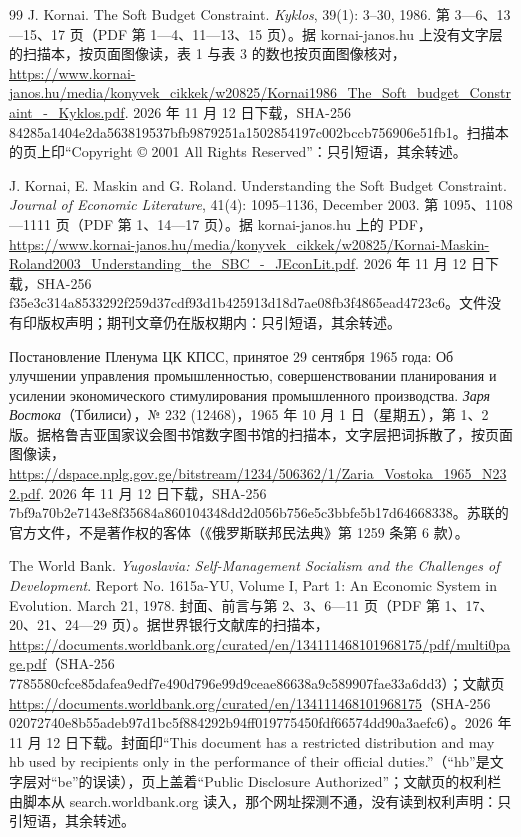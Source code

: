 \begin{thebibliography}{99}
 J. Kornai. The Soft Budget Constraint. \emph{Kyklos}, 39(1): 3--30, 1986. 第 3—6、13—15、17 页（PDF 第 1—4、11—13、15 页）。据 kornai-janos.hu 上没有文字层的扫描本，按页面图像读，表 1 与表 3 的数也按页面图像核对，\url{https://www.kornai-janos.hu/media/konyvek_cikkek/w20825/Kornai1986_The_Soft_budget_Constraint_-_Kyklos.pdf}. 2026 年 11 月 12 日下载，SHA-256 84285a1404e2da563819537bfb9879251a1502854197c002bccb756906e51fb1。扫描本的页上印“Copyright © 2001 All Rights Reserved”：只引短语，其余转述。

 J. Kornai, E. Maskin and G. Roland. Understanding the Soft Budget Constraint. \emph{Journal of Economic Literature}, 41(4): 1095--1136, December 2003. 第 1095、1108—1111 页（PDF 第 1、14—17 页）。据 kornai-janos.hu 上的 PDF，\url{https://www.kornai-janos.hu/media/konyvek_cikkek/w20825/Kornai-Maskin-Roland2003_Understanding_the_SBC_-_JEconLit.pdf}. 2026 年 11 月 12 日下载，SHA-256 f35e3c314a8533292f259d37cdf93d1b425913d18d7ae08fb3f4865ead4723c6。文件没有印版权声明；期刊文章仍在版权期内：只引短语，其余转述。

 Постановление Пленума ЦК КПСС, принятое 29 сентября 1965 года: Об улучшении управления промышленностью, совершенствовании планирования и усилении экономического стимулирования промышленного производства. \emph{Заря Востока}（Тбилиси），№ 232 (12468)，1965 年 10 月 1 日（星期五），第 1、2 版。据格鲁吉亚国家议会图书馆数字图书馆的扫描本，文字层把词拆散了，按页面图像读，\url{https://dspace.nplg.gov.ge/bitstream/1234/506362/1/Zaria_Vostoka_1965_N232.pdf}. 2026 年 11 月 12 日下载，SHA-256 7bf9a70b2e7143e8f35684a860104348dd2d056b756e5c3bbfe5b17d64668338。苏联的官方文件，不是著作权的客体（《俄罗斯联邦民法典》第 1259 条第 6 款）。

 The World Bank. \emph{Yugoslavia: Self-Management Socialism and the Challenges of Development}. Report No. 1615a-YU, Volume I, Part 1: An Economic System in Evolution. March 21, 1978. 封面、前言与第 2、3、6—11 页（PDF 第 1、17、20、21、24—29 页）。据世界银行文献库的扫描本，\url{https://documents.worldbank.org/curated/en/134111468101968175/pdf/multi0page.pdf}（SHA-256 7785580cfce85dafea9edf7e490d796e99d9ceae86638a9c589907fae33a6dd3）；文献页 \url{https://documents.worldbank.org/curated/en/134111468101968175}（SHA-256 02072740e8b55adeb97d1bc5f884292b94ff019775450fdf66574dd90a3aefc6）。2026 年 11 月 12 日下载。封面印“This document has a restricted distribution and may hb used by recipients only in the performance of their official duties.”（“hb”是文字层对“be”的误读），页上盖着“Public Disclosure Authorized”；文献页的权利栏由脚本从 search.worldbank.org 读入，那个网址探测不通，没有读到权利声明：只引短语，其余转述。


\end{thebibliography}
